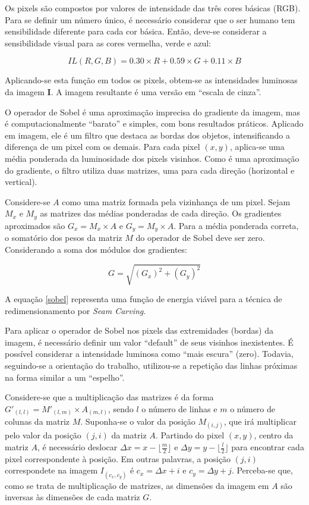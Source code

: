 Os pixels são compostos por valores de intensidade 
das três cores básicas (RGB).
Para se definir um número único, 
é necessário considerar que o ser humano tem sensibilidade diferente 
para cada cor básica. 
Então, deve-se considerar a sensibilidade visual para 
as cores vermelha, verde e azul:

\begin{equation}
\label{luminosity}
    IL(R,G,B) = 0.30 \times R + 0.59 \times G + 0.11 \times B
\end{equation}

Aplicando-se esta função em todos os pixels, 
obtem-se as intensidades luminosas da imagem $\mathbf{I}$.
A imagem resultante é uma versão em ``escala de cinza''.

O operador de Sobel é uma aproximação imprecisa do gradiente da imagem,
mas é computacionalmente ``barato'' e simples, 
com bons resultados práticos. 
Aplicado em imagem, ele é um filtro que destaca as bordas dos objetos,
intensificando a diferença de um pixel com os demais.
Para cada pixel $(x,y)$, aplica-se uma média ponderada da luminosidade dos
pixels visinhos. 
Como é uma aproximação do gradiente, 
o filtro utiliza duas matrizes, uma para cada direção (horizontal e vertical).

Considere-se $A$ como uma matriz formada pela vizinhança de um pixel.
Sejam $M_x$ e $M_y$ as matrizes das médias ponderadas de cada direção.
Os gradientes aproximados são $G_x = M_x \times A$ e $G_y = M_y \times A$.
Para a média ponderada correta, o somatório dos pesos da matriz $M$ do
operador de Sobel deve ser zero.
Considerando a soma dos módulos dos gradientes:

\begin{equation}
\label{sobel}
    G = \sqrt{(G_x)^2 + (G_y)^2}
\end{equation}

A equação \ref{sobel} representa uma função de energia viável para a
técnica de redimensionamento por \emph{Seam Carving}\citep{shai2007seam}.

Para aplicar o operador de Sobel nos pixels 
das extremidades (bordas) da imagem, 
é necessário definir um valor ``default'' de seus visinhos inexistentes.
É possível considerar a intensidade luminosa como ``mais escura'' (zero).
Todavia, seguindo-se a orientação do trabalho,
utilizou-se a repetição das linhas próximas na forma similar a um ``espelho''.

Considere-se que a multiplicação das matrizes é da forma 
$G'_{(l,l)} = M'_{(l,m)} \times A_{(m,l)}$,
sendo $l$ o número de linhas e $m$ o número de colunas da matriz $M$.
Suponha-se o valor da posição $M_{(i,j)}$, que irá multiplicar 
pelo valor da posição $(j, i)$ da matriz $A$.
Partindo do pixel $(x, y)$, centro da matriz $A$, 
é necessário deslocar 
$\Delta{x} = x - \lfloor\frac{m}{2}\rfloor$ e 
$\Delta{y} = y - \lfloor\frac{l}{2}\rfloor$ 
para encontrar cada pixel correspondente à posição.
Em outras palavras, a posição $(j, i)$ correspondete na imagem $I_{(c_x, c_y)}$ é 
$c_x = \Delta{x} + i$ e $c_y = \Delta{y} + j$.
Perceba-se que, como se trata de multiplicação de matrizes, 
as dimensões da imagem em $A$ são inversas às dimensões de cada matriz $G$.


